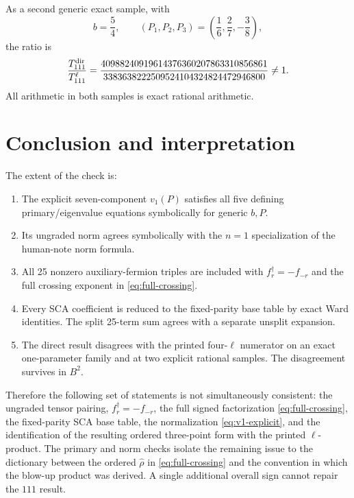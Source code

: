 \documentclass[11pt]{article}
\newcommand{\hatrho}{\widehat\rho}
\begin{document}
As a second generic exact sample, with
\begin{equation}
 b=\frac54,\qquad(P_1,P_2,P_3)=\left(\frac16,\frac27,-\frac38\right),
\end{equation}
the ratio is
\begin{equation}
 \frac{T_{111}^{\rm dir}}{T_{111}^{\ell}}
 =\frac{40988240919614376360207863310856861}
 {3383638222509524104324824472946800}\ne1.
\end{equation}
All arithmetic in both samples is exact rational arithmetic.

\section{Conclusion and interpretation}

The extent of the check is:
\begin{enumerate}
\item The explicit seven-component \(v_1(P)\) satisfies all five defining
  primary/eigenvalue equations symbolically for generic \(b,P\).
\item Its ungraded norm agrees symbolically with the \(n=1\) specialization
  of the human-note norm formula.
\item All 25 nonzero auxiliary-fermion triples are included with
  \(f_r^\dagger=-f_{-r}\) and the full crossing exponent in
  \eqref{eq:full-crossing}.
\item Every SCA coefficient is reduced to the fixed-parity base table by
  exact Ward identities.  The split 25-term sum agrees with a separate
  unsplit expansion.
\item The direct result disagrees with the printed four-\(\ell\) numerator on
  an exact one-parameter family and at two explicit rational samples.  The
  disagreement survives in \(B^2\).
\end{enumerate}

Therefore the following set of statements is not simultaneously consistent:
the ungraded tensor pairing, \(f_r^\dagger=-f_{-r}\), the full signed
factorization \eqref{eq:full-crossing}, the fixed-parity SCA base table, the
normalization \eqref{eq:v1-explicit}, and the identification of the resulting
ordered three-point form with the printed \(\ell\)-product.  The primary and
norm checks isolate the remaining issue to the dictionary between the
ordered \(\hatrho\) in \eqref{eq:full-crossing} and the convention in which
the blow-up product was derived.  A single additional overall sign cannot
repair the \(111\) result.
\end{document}
